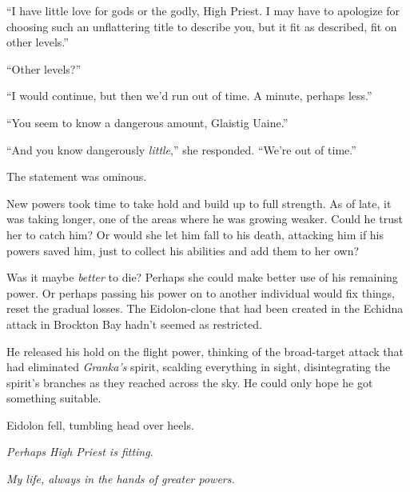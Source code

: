 ``I have little love for gods or the godly, High Priest.  I may have to apologize for choosing such an unflattering title to describe you, but it fit as described, fit on other levels.''



``Other levels?''



``I would continue, but then we'd run out of time.  A minute, perhaps less.''



``You seem to know a dangerous amount, Glaistig Uaine.''



``And you know dangerously \emph{little},'' she responded.  ``We're out of time.''



The statement was ominous.



New powers took time to take hold and build up to full strength.  As of late, it was taking longer, one of the areas where he was growing weaker.  Could he trust her to catch him?  Or would she let him fall to his death, attacking him if his powers saved him, just to collect his abilities and add them to her own?



Was it maybe \emph{better} to die?  Perhaps she could make better use of his remaining power.  Or perhaps passing his power on to another individual would fix things, reset the gradual losses.  The Eidolon-clone that had been created in the Echidna attack in Brockton Bay hadn't seemed as restricted.



He released his hold on the flight power, thinking of the broad-target attack that had eliminated \emph{Granka's} spirit, scalding everything in sight, disintegrating the spirit's branches as they reached across the sky.  He could only hope he got something suitable.



Eidolon fell, tumbling head over heels.



\emph{Perhaps High Priest is fitting}.



\emph{My life, always in the hands of greater powers.}



\blacksquare






